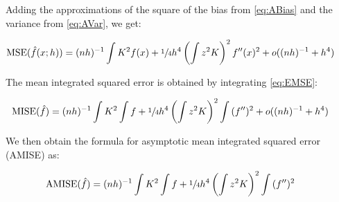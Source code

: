 Adding the approximations of the square of the bias from \autoref{eq:ABias} and the variance from \autoref{eq:AVar}, we get:

\begin{align}
\mbox{MSE}(\hat{f}(x;h)) & = (nh)^{-1} \int{K^2}f(x) + \sfrac{1}{4}h^4\left(\int{z^2K}\right)^2f^{\prime\prime}(x)^2 + o((nh)^{-1} + h^4) && \label{eq:EMSE}
\end{align}

The mean integrated squared error is obtained by integrating \autoref{eq:EMSE}:

\begin{align}
\mbox{MISE}(\hat{f}) & = (nh)^{-1} \int{K^2}\int{f} + \sfrac{1}{4}h^4\left(\int{z^2K}\right)^2 \int{ (f^{\prime\prime})^2 } + o((nh)^{-1} + h^4) && \label{eq:EMISE}
\end{align}

We then obtain the formula for asymptotic mean integrated squared error (AMISE) as:

\begin{align}
\mbox{AMISE}(\hat{f}) & = (nh)^{-1} \int{K^2}\int{f} + \sfrac{1}{4}h^4\left(\int{z^2K}\right)^2 \int{ (f^{\prime\prime})^2 } && \label{eq:AMISE}
\end{align}



